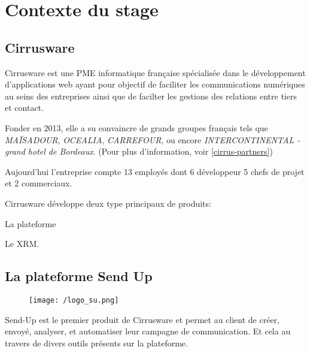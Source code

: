\section{Contexte du stage}
\subsection{Cirrusware}
Cirrusware est une PME informatique française spécialisée dans le développement d'applications web ayant pour objectif de faciliter les communications numériques au seins des entreprises ainsi que de facilter les gestions des relations entre tiers et contact. 

Fonder en 2013, elle a su convaincre de grands groupes français tels que \textit{MAÏSADOUR}, \textit{OCEALIA}, \textit{CARREFOUR}, ou encore \textit{INTERCONTINENTAL - grand hotel de Bordeaux}. (Pour plus d'information, voir \ref{cirrus-partners}) 

Aujourd'hui l'entreprise compte 13 employés dont 6 développeur 5 chefs de projet et 2 commerciaux. 


Cirrusware développe deux type principaux de produits: 
\begin{list}{}{}
    \item La plateforme \cite{sendup}
    \item Le XRM. 
\end{list}

\subsection{La plateforme Send Up}
\begin{figure}[!h]
\centering
    \texttt{[image: /logo\_su.png]}

\end{figure}
Send-Up est le premier produit de Cirrusware et permet au client de  créer, envoyé, analyser, et automatiser leur campagne de communication. Et cela au travers de divers outils présents sur la plateforme.


